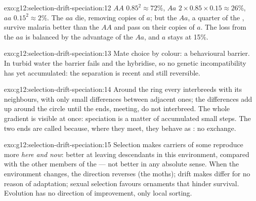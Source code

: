 \begin{solution}{exo:g12:selection-drift-speciation:12}
$AA$ $0.85^2 \approx 72\%$, $Aa$ $2 \times 0.85 \times 0.15 \approx
26\%$, $aa$ $0.15^2 \approx 2\%$. The $aa$ die, removing copies of
$a$; but the $Aa$, a quarter of the , survive malaria better
than the $AA$ and pass on their copies of $a$. The loss from the $aa$
is balanced by the advantage of the $Aa$, and $a$ stays at 15\%.
\end{solution}

\begin{solution}{exo:g12:selection-drift-speciation:13}
Mate choice by colour: a behavioural barrier. In turbid water the
barrier fails and the  hybridise, so no genetic
incompatibility has yet accumulated: the separation is recent and
still reversible.
\end{solution}

\begin{solution}{exo:g12:selection-drift-speciation:14}
Around the ring every  interbreeds with its neighbours,
with only small differences between adjacent ones; the differences
add up around the circle until the ends, meeting, do not interbreed.
The whole gradient is visible at once: speciation is a matter of
accumulated small steps. The two ends are called  because,
where they meet, they behave as : no  exchange.
\end{solution}

\begin{solution}{exo:g12:selection-drift-speciation:15}
Selection makes carriers of some  reproduce more \emph{here
and now}: better at leaving descendants in this environment, compared
with the other members of the  --- not better in any
absolute sense. When the environment changes, the direction reverses
(the moths); drift makes  differ for no reason of
adaptation; sexual selection favours ornaments that hinder survival.
Evolution has no direction of improvement, only local sorting.
\end{solution}

